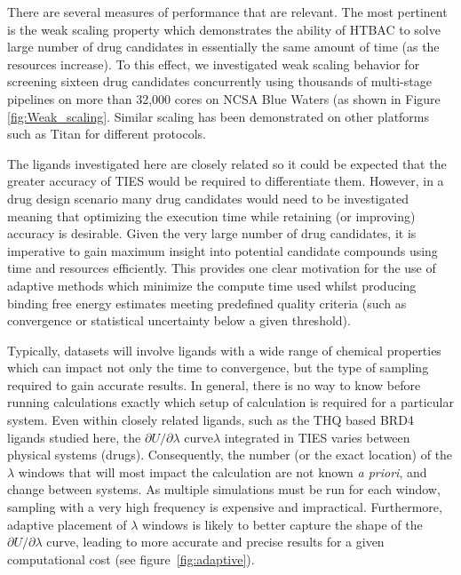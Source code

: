 \documentclass[conference]{IEEEtran}
\begin{document}
There are several measures of performance that are relevant. The most
pertinent is the weak scaling property which demonstrates the ability of HTBAC
to solve large number of drug candidates in essentially the same amount of
time (as the resources increase). To this effect, we investigated weak scaling
behavior for screening sixteen drug candidates concurrently using thousands of
multi-stage pipelines on more than 32,000 cores on NCSA Blue Waters (as shown
in Figure \ref{fig:Weak_scaling}. Similar scaling has been demonstrated on other 
platforms such as Titan for different protocols. 



The ligands investigated here are closely related so it could be expected that the
greater accuracy of TIES would be required to differentiate them.
However, in a drug design scenario many drug candidates would need to be investigated
meaning that optimizing the execution time while retaining (or improving) accuracy is
desirable. 
Given the very large number of drug candidates, it is imperative to
gain maximum insight into potential candidate compounds using time and
resources efficiently. 
This provides one clear motivation for the use of
adaptive methods which minimize the compute time used whilst producing binding
free energy estimates meeting predefined quality criteria (such as
convergence or statistical uncertainty below a given threshold).


Typically, datasets will involve ligands with a wide range of chemical 
properties which can impact not only the time to convergence, but the type 
of sampling required to gain accurate results.
In general, there is no way to know before running
calculations exactly which setup of calculation is required for a particular
system. 
Even within closely related ligands, such as the THQ based BRD4 ligands 
studied here, the $\partial U/\partial\lambda$ curve$\lambda$ integrated in TIES 
varies between physical systems (drugs). 
Consequently, the number (or the exact location) of the
$\lambda$ windows that will most impact the calculation are not known
\textit{a priori}, and change between systems. 
As multiple
simulations must be run for each window, sampling with a very high frequency
is expensive and impractical. Furthermore, adaptive placement of $\lambda$
windows is likely to better capture the shape of the
$\partial U/\partial\lambda$ curve, leading to more accurate and precise
results for a given computational cost (see figure~\ref{fig:adaptive}).
\end{document}

